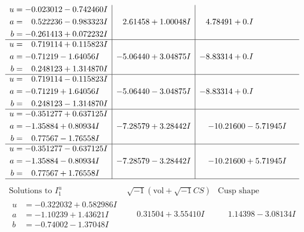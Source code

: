 \documentclass[1p]{elsarticle_modified}
\theoremstyle{definition}
\newcommand{\I}{\sqrt{-1}}
\begin{document}
$$\begin{array}{c|c|c}
\begin{aligned}
u &= -0.023012 - 0.742460 I \\
a &= \phantom{-}0.522236 - 0.983323 I \\
b &= -0.261413 + 0.072232 I\end{aligned}
 & \phantom{-}2.61458 + 1.00048 I & \phantom{-}4.78491 + 0. I\phantom{ +0.000000I} \\ \hline\begin{aligned}
u &= \phantom{-}0.719114 + 0.115823 I \\
a &= -0.71219 - 1.64056 I \\
b &= \phantom{-}0.248123 + 1.314870 I\end{aligned}
 & -5.06440 + 3.04875 I & -8.83314 + 0. I\phantom{ +0.000000I} \\ \hline\begin{aligned}
u &= \phantom{-}0.719114 - 0.115823 I \\
a &= -0.71219 + 1.64056 I \\
b &= \phantom{-}0.248123 - 1.314870 I\end{aligned}
 & -5.06440 - 3.04875 I & -8.83314 + 0. I\phantom{ +0.000000I} \\ \hline\begin{aligned}
u &= -0.351277 + 0.637125 I \\
a &= -1.35884 + 0.80934 I \\
b &= \phantom{-}0.77567 - 1.76558 I\end{aligned}
 & -7.28579 + 3.28442 I & -10.21600 - 5.71945 I \\ \hline\begin{aligned}
u &= -0.351277 - 0.637125 I \\
a &= -1.35884 - 0.80934 I \\
b &= \phantom{-}0.77567 + 1.76558 I\end{aligned}
 & -7.28579 - 3.28442 I & -10.21600 + 5.71945 I\\
 \hline 
 \end{array}$$\newpage$$\begin{array}{c|c|c}  
\text{Solutions to }I^u_{1}& \I (\text{vol} + \sqrt{-1}CS) & \text{Cusp shape}\\
 \hline 
\begin{aligned}
u &= -0.322032 + 0.582986 I \\
a &= -1.10239 + 1.43621 I \\
b &= -0.74002 - 1.37048 I\end{aligned}
 & \phantom{-}0.31504 + 3.55410 I & \phantom{-}1.14398 - 3.08134 I \\ \hline\begin{aligned}

\end{aligned}
\end{array}$$
\end{document}
